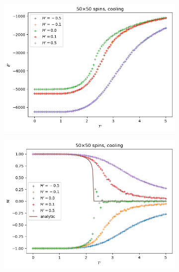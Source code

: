 \documentclass[11pt]{article}
\begin{document}
\begin{figure}[H]
    \centering
    \begin{subfigure}[H]{0.48\textwidth}
        \centering
        \includegraphics[width=\textwidth]{Cool/cool_energy_N50_steps2000000-10000000_Hsteps1000000.png}
        \caption{}
        \label{coolEs}
    \end{subfigure}
    \hfill
    \centering
    \begin{subfigure}[H]{0.48\textwidth}
        \centering
        \includegraphics[width=\textwidth]{Cool/cool_magnetization_N50_steps2000000-10000000_Hsteps1000000.png}
        \caption{}
        \label{coolMs}
    \end{subfigure}


\end{figure}
\end{document}
